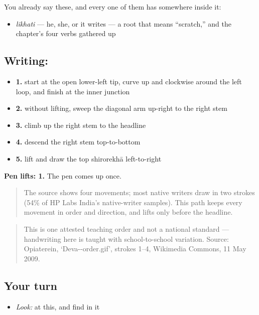 You already say these, and every one of them has  somewhere inside it:

\begin{itemize}
\raggedright
  \item \textbf{} \emph{likhati} — he, she, or it writes — a root that means \textquotedblleft{}scratch,\textquotedblright{} and the chapter's four verbs gathered up
\end{itemize}

\subsection*{Writing: }

\begin{itemize}
\raggedright
  \item \textbf{1.} start at the open lower-left tip, curve up and clockwise around the left loop, and finish at the inner junction
  \item \textbf{2.} without lifting, sweep the diagonal arm up-right to the right stem
  \item \textbf{3.} climb up the right stem to the headline
  \item \textbf{4.} descend the right stem top-to-bottom
  \item \textbf{5.} lift and draw the top shirorekhā left-to-right
\end{itemize}

\textbf{Pen lifts: 1.} The pen comes up once.

\begin{quote}
The source shows four movements; most native writers draw  in two strokes (54\% of HP Labs India's native-writer samples). This path keeps every movement in order and direction, and lifts only before the headline.
\end{quote}

\begin{quote}
This is one attested teaching order and not a national standard — handwriting here is taught with school-to-school variation. Source: Opiaterein, ‘Deva--order.gif’, strokes 1–4, Wikimedia Commons, 11 May 2009.
\end{quote}

\subsection*{Your turn}
\begin{itemize}
\raggedright
  \item \emph{Look:} at this, and find  in it
\end{itemize}

